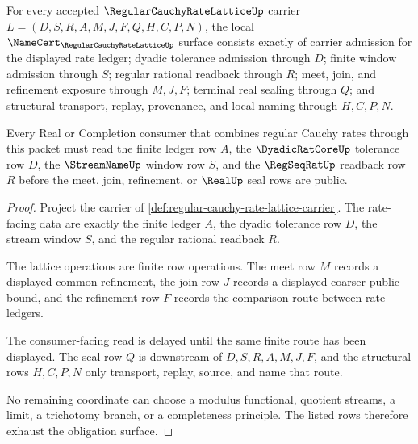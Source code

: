 \begin{theorem}
\label{thm:regular-cauchy-rate-lattice-obligation-surface}
For every accepted $\RegularCauchyRateLatticeUp$ carrier $L=(D,S,R,A,M,J,F,Q,H,C,P,N)$, the local $\NameCert_{\RegularCauchyRateLatticeUp}$ surface consists exactly of carrier admission for the displayed rate ledger; dyadic tolerance admission through $D$; finite window admission through $S$; regular rational readback through $R$; meet, join, and refinement exposure through $M,J,F$; terminal real sealing through $Q$; and structural transport, replay, provenance, and local naming through $H,C,P,N$.

Every Real or Completion consumer that combines regular Cauchy rates through this packet must read the finite ledger row $A$, the $\DyadicRatCoreUp$ tolerance row $D$, the $\StreamNameUp$ window row $S$, and the $\RegSeqRatUp$ readback row $R$ before the meet, join, refinement, or $\RealUp$ seal rows are public.
\end{theorem}
\begin{proof}
Project the carrier of \autoref{def:regular-cauchy-rate-lattice-carrier}. The rate-facing data are exactly the finite ledger $A$, the dyadic tolerance row $D$, the stream window $S$, and the regular rational readback $R$.

The lattice operations are finite row operations. The meet row $M$ records a displayed common refinement, the join row $J$ records a displayed coarser public bound, and the refinement row $F$ records the comparison route between rate ledgers.

The consumer-facing read is delayed until the same finite route has been displayed. The seal row $Q$ is downstream of $D,S,R,A,M,J,F$, and the structural rows $H,C,P,N$ only transport, replay, source, and name that route.

No remaining coordinate can choose a modulus functional, quotient streams, a limit, a trichotomy branch, or a completeness principle. The listed rows therefore exhaust the obligation surface.
\end{proof}


